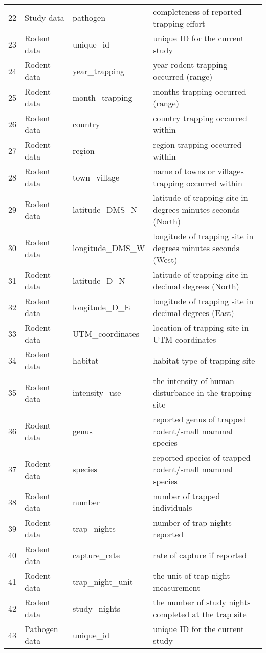 \begin{table}[ht]
\begin{tabular}{rlll}
  22 & Study data & pathogen & completeness of reported trapping effort \\ 
  23 & Rodent data & unique\_id & unique ID for the current study \\ 
  24 & Rodent data & year\_trapping & year rodent trapping occurred (range) \\ 
  25 & Rodent data & month\_trapping & months trapping occurred (range) \\ 
  26 & Rodent data & country & country trapping occurred within \\ 
  27 & Rodent data & region & region trapping occurred within \\ 
  28 & Rodent data & town\_village & name of towns or villages trapping occurred within \\ 
  29 & Rodent data & latitude\_DMS\_N & latitude of trapping site in degrees minutes seconds (North) \\ 
  30 & Rodent data & longitude\_DMS\_W & longitude of trapping site in degrees minutes seconds (West) \\ 
  31 & Rodent data & latitude\_D\_N & latitude of trapping site in decimal degrees (North) \\ 
  32 & Rodent data & longitude\_D\_E & longitude of trapping site in decimal degrees (East) \\ 
  33 & Rodent data & UTM\_coordinates & location of trapping site in UTM coordinates \\ 
  34 & Rodent data & habitat & habitat type of trapping site \\ 
  35 & Rodent data & intensity\_use & the intensity of human disturbance in the trapping site \\ 
  36 & Rodent data & genus & reported genus of trapped rodent/small mammal species \\ 
  37 & Rodent data & species & reported species of trapped rodent/small mammal species \\ 
  38 & Rodent data & number & number of trapped individuals \\ 
  39 & Rodent data & trap\_nights & number of trap nights reported \\ 
  40 & Rodent data & capture\_rate & rate of capture if reported \\ 
  41 & Rodent data & trap\_night\_unit & the unit of trap night measurement \\ 
  42 & Rodent data & study\_nights & the number of study nights completed at the trap site \\ 
  43 & Pathogen data & unique\_id & unique ID for the current study \\ 

\end{tabular}
\end{table}
